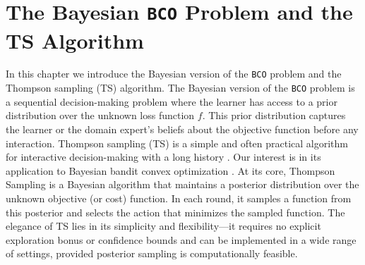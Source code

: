 \documentclass[letter, 12pt]{report}
\newcommand{\1}{\mathbf{1}}
\newcommand{\bco}{\texttt{BCO}\xspace}
\newcommand{\ts}{\textsc{TS}\xspace}
\theoremstyle{plain}
\theoremstyle{definition}
\theoremstyle{remark}
\begin{document}
\chapter{The Bayesian \bco Problem and the \ts Algorithm}
\label{ch:ts-bayesian}

In this chapter we introduce the Bayesian version of the \bco problem and the Thompson sampling (\ts) algorithm.
The Bayesian version of the \bco problem is a sequential decision-making problem where the learner has access to a prior distribution over the unknown loss function $f$.
This prior distribution captures the learner or the domain expert's beliefs about the objective function before any interaction.
Thompson sampling (\ts) is a simple and often practical algorithm for interactive decision-making with a long history \citep{Tho33,RVK17}.
Our interest is in its application to Bayesian bandit convex optimization \citep{lat24book}.
At its core, Thompson Sampling is a Bayesian algorithm that maintains a posterior distribution over the unknown objective (or cost) function.
In each round, it samples a function from this posterior and selects the action that minimizes the sampled function.
The elegance of \ts lies in its simplicity and flexibility---it requires no explicit exploration bonus or confidence bounds and can be
implemented in a wide range of settings, provided posterior sampling is computationally feasible.
\end{document}
